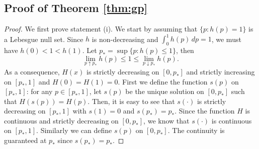 \documentclass{biometrika}
\newcommand{\pth}{p_{*}}
\newcommand{\1}{\mathbf{1}}
\begin{document}
\subsection{Proof of Theorem \ref{thm:gp}}\label{subapp:proof_theorem_gp}
\label{sec:proof-thm2}
\begin{proof}
  We first prove statement (i). We start by assuming that $\{p: h(p) = 1\}$ is a Lebesgue null set. Since $h$ is non-decreasing and $\int_{0}^{1}h(p)\, dp = 1$, we must have $h(0) < 1 < h(1)$. Let $\pth = \sup\{p: h(p)\le 1\}$, then
\[\lim_{p\uparrow \pth} h(p)\le 1 \le \lim_{p\downarrow \pth}h(p).\]
As a consequence, $H(x)$ is strictly decreasing on $[0, \pth]$ and strictly increasing on $[\pth, 1]$ and $H(0) = H(1) = 0$. First we define the function $s(p)$ on $[\pth, 1]$: for any $p\in [\pth, 1]$, let $s(p)$ be the unique solution on $[0, \pth]$ such that $H(s(p)) = H(p)$. Then, it is easy to see that $s(\cdot)$ is strictly decreasing on $[\pth, 1]$ with $s(1) = 0$ and $s(\pth) = \pth$. Since the function $H$ is continuous and strictly decreasing on $[0, \pth]$, we know that $s(\cdot)$ is continuous on $[\pth, 1]$. Similarly we can define $s(p)$ on $[0, \pth]$. The continuity is guaranteed at $\pth$ since $s(\pth) = \pth$. 


\end{proof}
\end{document}
